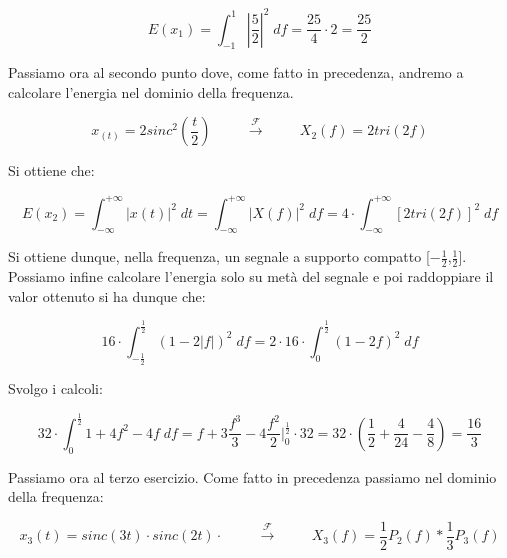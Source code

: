 \documentclass[../main.tex]{subfiles}
\begin{document}
\begin{equation}
	E(x_1) = \int_{-1}^{1} \left|\frac{5}{2}\right|^2 \; df = \frac{25}{4} \cdot 2 = \frac{25}{2}
\end{equation}

Passiamo ora al secondo punto dove, come fatto in precedenza, andremo a calcolare l'energia nel dominio della frequenza.

\begin{equation}
	x_(t) = 2 \unit{sinc}^2\left(\frac{t}{2}\right) \hspace{1cm} \xrightarrow{\mathcal{F}}  \hspace{1cm} X_2(f) = 2 \unit{tri} (2f)
\end{equation}

Si ottiene che:

\begin{equation}
	E(x_2) = \int_{-\infty}^{+\infty} |x(t)|^2 \; dt = \int_{-\infty}^{+\infty} |X(f)|^2 \; df = 4 \cdot \int_{-\infty}^{+\infty} [ 2 \unit{tri}(2f)]^2 \;df
\end{equation}

Si ottiene dunque, nella frequenza, un segnale a supporto compatto [$-\frac{1}{2}$,$\frac{1}{2}$].
Possiamo infine calcolare l'energia solo su  metà del segnale e poi raddoppiare il valor ottenuto si ha dunque che:

\begin{equation}
	16 \cdot \int_{-\frac{1}{2}}^{\frac{1}{2}} (1 - 2|f|)^2 \; df = 2 \cdot 16 \cdot \int_{0}^{\frac{1}{2}} (1 - 2f)^2 \; df 
\end{equation} 

Svolgo i calcoli:

\begin{equation}
	32 \cdot \int_{0}^{\frac{1}{2}} 1 + 4f^2 -4f \; df = f + 3 \frac{f^3}{3} - 4 \frac{f^2}{2} \bigg|_0^{\frac{1}{2}} \cdot 32 = 32 \cdot \left( \frac{1}{2} +  \frac{4}{24} - \frac{4}{8} \right) = \frac{16}{3}
\end{equation}

Passiamo ora al terzo esercizio.
Come fatto in precedenza passiamo nel dominio della frequenza:

\begin{equation}
	x_3(t) = \unit{sinc}(3t) \cdot \unit{sinc}(2t) \cdot \hspace{1cm} \xrightarrow{\mathcal{F}}  \hspace{1cm} X_3(f) = \frac{1}{2}P_2(f) \ast \frac{1}{3}P_3(f)
\end{equation}
\end{document}

